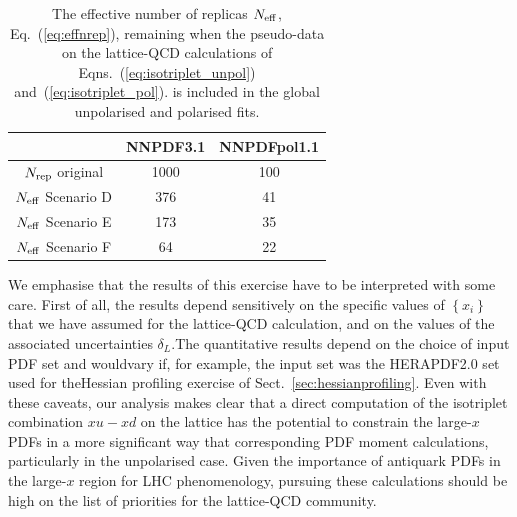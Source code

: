\begin{table}[h!]
  \centering
  \renewcommand{\arraystretch}{1.3} 
  \begin{tabular}{c|c|c}
    \hline
    &  NNPDF3.1  &  NNPDFpol1.1 \\
    \hline
    \hline
    $N_{\rm rep}$ original   &   1000 &  100   \\
    \hline
     $N_{\rm eff}$ Scenario D    &   376  &  41   \\
     $N_{\rm eff}$ Scenario E    &   173   &   35  \\
     $N_{\rm eff}$ Scenario F   &   64  &   22  \\
    \hline
  \end{tabular}
  \caption{\small The effective number of replicas
    $N_{\rm eff}$, Eq.~(\ref{eq:effnrep}), remaining when the pseudo-data
    on the lattice-QCD calculations
    of Eqns.~(\ref{eq:isotriplet_unpol})
and~(\ref{eq:isotriplet_pol}).
   is included in the global
    unpolarised and polarised fits. 
    \label{tab:neffxspace}
  }
\end{table}

We emphasise that
the results of this exercise have to be interpreted
with some care.
%
First of all, the results depend sensitively on the specific values of
$\left\{ x_i \right\}$
that we have assumed for the lattice-QCD calculation,
and on the values
of the associated uncertainties $\delta_L$.
%
​The​ ​quantitative​ ​results​ ​depend​ ​on​ ​the​ ​choice​ ​of​ ​input​ ​PDF​ ​set​ ​and​ ​would​ ​vary​ ​if,​ ​for​ ​example,
the​ ​input​ ​set​ ​was​ ​the​ ​HERAPDF2.0​ ​set​ ​used​ ​for​ ​the​ ​Hessian​ ​profiling​ ​exercise​ ​of​ Sect.~\ref{sec:hessianprofiling}.
%
Even with these caveats, our analysis makes clear that a direct
computation of the isotriplet combination $x u-x d$ on the lattice
has the potential to constrain the large-$x$ PDFs in
a more significant way that corresponding PDF moment calculations,
particularly in the unpolarised case.
%
Given the importance of antiquark PDFs in the large-$x$ region for LHC phenomenology,
pursuing these calculations should be high on the list
of priorities for the lattice-QCD community.

